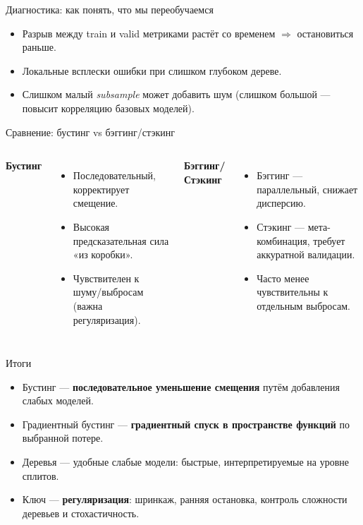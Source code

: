 \documentclass[aspectratio=169]{beamer}
\begin{document}
\begin{frame}{Диагностика: как понять, что мы переобучаемся}
	\begin{itemize}
		\item Разрыв между train и valid метриками растёт со временем $\Rightarrow$ остановиться раньше.
		\item Локальные всплески ошибки при слишком глубоком дереве.
		\item Слишком малый \textit{subsample} может добавить шум (слишком большой — повысит корреляцию базовых моделей).
	\end{itemize}
\end{frame}

\begin{frame}{Сравнение: бустинг vs бэггинг/стэкинг}
	\begin{columns}[T,onlytextwidth]
		\textbf{Бустинг}
		\begin{itemize}
			\item Последовательный, корректирует смещение.
			\item Высокая предсказательная сила «из коробки».
			\item Чувствителен к шуму/выбросам (важна регуляризация).
		\end{itemize}
		\textbf{Бэггинг/Стэкинг}
		\begin{itemize}
			\item Бэггинг — параллельный, снижает дисперсию.
			\item Стэкинг — мета-комбинация, требует аккуратной валидации.
			\item Часто менее чувствительны к отдельным выбросам.
		\end{itemize}
	\end{columns}
\end{frame}

\begin{frame}{Итоги}
	\begin{itemize}
		\item Бустинг — \textbf{последовательное уменьшение смещения} путём добавления слабых моделей.
		\item Градиентный бустинг — \textbf{градиентный спуск в пространстве функций} по выбранной потере.
		\item Деревья — удобные слабые модели: быстрые, интерпретируемые на уровне сплитов.
		\item Ключ — \textbf{регуляризация}: шринкаж, ранняя остановка, контроль сложности деревьев и стохастичность.
	\end{itemize}
\end{frame}
\end{document}

